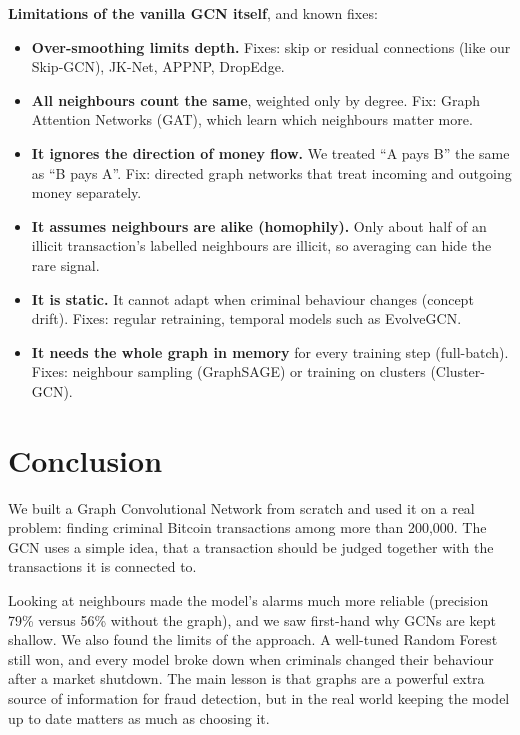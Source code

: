\documentclass[11pt,a4paper]{article}
\begin{document}
\textbf{Limitations of the vanilla GCN itself}, and known fixes:
\begin{itemize}
  \item \textbf{Over-smoothing limits depth.} Fixes: skip or residual connections (like our Skip-GCN), JK-Net, APPNP, DropEdge.
  \item \textbf{All neighbours count the same}, weighted only by degree. Fix: Graph Attention Networks (GAT), which learn which
        neighbours matter more.
  \item \textbf{It ignores the direction of money flow.} We treated ``A pays B'' the same as ``B pays A''. Fix: directed graph
        networks that treat incoming and outgoing money separately.
  \item \textbf{It assumes neighbours are alike (homophily).} Only about half of an illicit transaction's labelled neighbours are
        illicit, so averaging can hide the rare signal.
  \item \textbf{It is static.} It cannot adapt when criminal behaviour changes (concept drift). Fixes: regular retraining,
        temporal models such as EvolveGCN.
  \item \textbf{It needs the whole graph in memory} for every training step (full-batch). Fixes: neighbour sampling
        (GraphSAGE) or training on clusters (Cluster-GCN).
\end{itemize}

\section{Conclusion}
We built a Graph Convolutional Network from scratch and used it on a real problem: finding criminal Bitcoin transactions among
more than 200,000. The GCN uses a simple idea, that a transaction should be judged together with the transactions it is
connected to.

Looking at neighbours made the model's alarms much more reliable (precision 79\% versus 56\% without the graph), and we saw
first-hand why GCNs are kept shallow. We also found the limits of the approach. A well-tuned Random Forest still won, and
every model broke down when criminals changed their behaviour after a market shutdown. The main lesson is that graphs are a
powerful extra source of information for fraud detection, but in the real world keeping the model up to date matters as much
as choosing it.
\end{document}
